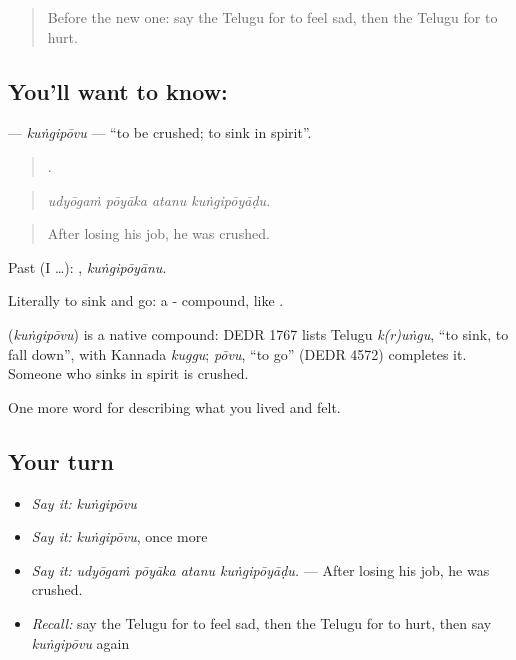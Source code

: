 \label{lesson:TE-C496-kungipovu}



\begin{quote}
Before the new one: say the Telugu for to feel sad, then the Telugu for to hurt.
\end{quote}

\subsection*{You'll want to know: }
\textbf{} — \emph{kuṅgipōvu} — \textquotedblleft{}to be crushed; to sink in spirit\textquotedblright{}.

\begin{quote}
   .
\end{quote}

\begin{quote}
\emph{udyōgaṁ pōyāka atanu kuṅgipōyāḍu.}
\end{quote}

\begin{quote}
After losing his job, he was crushed.
\end{quote}

Past (I …): , \emph{kuṅgipōyānu}.

Literally to sink and go: a - compound, like .

\begin{cousinweb}
\textbf{} (\emph{kuṅgipōvu}) is a native compound: DEDR 1767 lists Telugu \emph{k(r)uṅgu}, \textquotedblleft{}to sink, to fall down\textquotedblright{}, with Kannada \emph{kuggu}; \emph{pōvu}, \textquotedblleft{}to go\textquotedblright{} (DEDR 4572) completes it. Someone who sinks in spirit is crushed.
\end{cousinweb}

\begin{grammarlens}[title={What you've built}]
One more word for describing what you lived and felt.
\end{grammarlens}

\subsection*{Your turn}
\begin{itemize}
\raggedright
  \item \emph{Say it:} \emph{kuṅgipōvu}
  \item \emph{Say it:} \emph{kuṅgipōvu}, once more
  \item \emph{Say it:} \emph{udyōgaṁ pōyāka atanu kuṅgipōyāḍu.} — After losing his job, he was crushed.
  \item \emph{Recall:} say the Telugu for to feel sad, then the Telugu for to hurt, then say \emph{kuṅgipōvu} again
\end{itemize}

